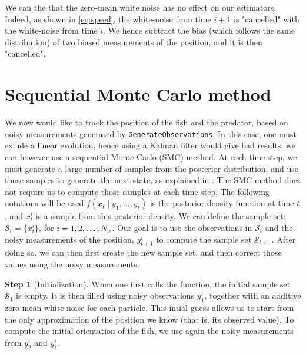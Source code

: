 \documentclass[final]{aomart}
\newtheorem[{}\it]{thm}{Theorem}[section]
\theoremstyle{definition}
\newtheorem*[{}\it]{notation}{Notation}
\newtheorem{step}{Step}
\numberwithin{equation}{section}
\newcommand{\np}{N_\textnormal{p}}
\newcommand{\sset}{\mathcal{S}}
\newcommand{\pdf}{f} %
\begin{document}
We can the that the zero-mean white noise has no effect on our estimators. Indeed, as shown in \eqref{eq:speed}, the white-noise from time \(i+1\) is "cancelled" with the white-noise from time \(i\). We hence subtract the bias (which follows the same distribution) of two biased measurements of the position, and it is then "cancelled".

\section{Sequential Monte Carlo method}
\label{sec:mcfilter}
We now would like to track the position of the fish and the predator, based on noisy measurements generated by \texttt{GenerateObservations}.
In this case, one must exlude a linear evolution, hence using a Kalman filter would give bad results; we can however use a sequential Monte Carlo  (SMC) method.
At each time step, we must generate a large number of samples from the posterior distribution, and use those samples to generate the next state,
as explained in \cite{filter}.
The SMC method does not require us to compute those samples at each time step.
The following notations will be used \(\pdf(x_t \mid y_1, \ldots ,y_t)\) is the posterior density function at time $t$, and \(x_t^i\) is a sample from this posterior density.
We can define the sample set: \(\sset_t = \{x_t^i\}\), for \(i = 1,2,\ldots,\np\).
Our goal is to use the observations in \(\sset_t\) and the noisy measurements of the position, \(y_{t+1}^i\) to compute the sample set \(\sset_{t+1}\).
After doing so, we can then first create the new sample set, and then correct those values using the noisy measurements.

\begin{step}[Initialization]
When one first calls the function, the initial sample set \(\sset_1\) is empty.
It is then filled using noisy observations \(y_1^i\), together with an additive zero-mean white-noise for each particle.
This intial guess allows us to start from the only approximation of the position we know (that is, its observed value).
To compute the initial orientation of the fish, we use again the noisy measurements from \(y_2^i\) and \(y_1^i\).
\end{step}
\end{document}
